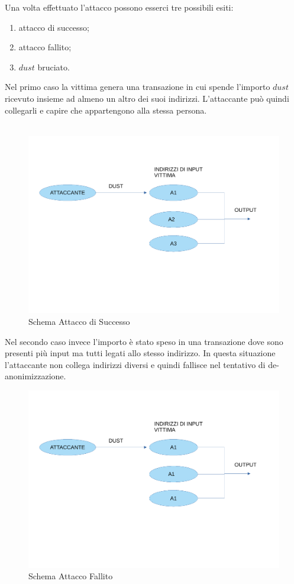 \FloatBarrier
Una volta effettuato l'attacco possono esserci tre possibili esiti: 
    \begin{enumerate}
        \item attacco di successo;
        \item attacco fallito;
        \item $dust$ bruciato.
    \end{enumerate}
Nel primo caso la vittima genera una transazione in cui spende l'importo $dust$ ricevuto insieme ad almeno un altro dei suoi indirizzi. L'attaccante può quindi collegarli e capire che appartengono alla stessa persona.\\\\
\begin{figure}[h!]
    \centering
    \includegraphics[scale=0.4]{Images/successo.pdf}
    \caption{Schema Attacco di Successo}
    \label{fig:success}
\end{figure}
\FloatBarrier
Nel secondo caso invece l'importo è stato speso in una transazione dove sono presenti più input ma tutti legati allo stesso indirizzo. In questa situazione l'attaccante non collega indirizzi diversi e quindi fallisce nel tentativo di de-anonimizzazione. 
\begin{figure}[h!]
    \centering
    \includegraphics[scale=0.35]{Images/fallimento.pdf}
    \caption{Schema Attacco Fallito}
    \label{fig:fallito}
\end{figure}
